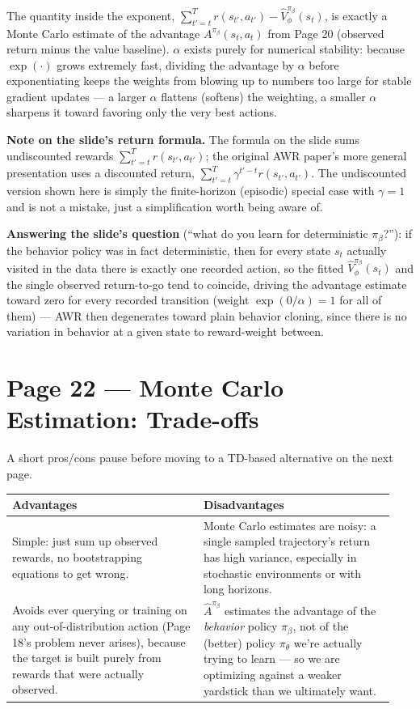 \documentclass[11pt]{article}
\begin{document}
The quantity inside the exponent, $\sum_{t'=t}^T r(s_{t'},a_{t'}) - \hat V^{\pi_\beta}_\phi(s_t)$, is exactly a Monte Carlo estimate of the advantage $A^{\pi_\beta}(s_t,a_t)$ from Page 20 (observed return minus the value baseline). $\alpha$ exists purely for numerical stability: because $\exp(\cdot)$ grows extremely fast, dividing the advantage by $\alpha$ before exponentiating keeps the weights from blowing up to numbers too large for stable gradient updates --- a larger $\alpha$ flattens (softens) the weighting, a smaller $\alpha$ sharpens it toward favoring only the very best actions.

\textbf{Note on the slide's return formula.} The formula on the slide sums undiscounted rewards $\sum_{t'=t}^T r(s_{t'},a_{t'})$; the original AWR paper's more general presentation uses a discounted return, $\sum_{t'=t}^T \gamma^{t'-t} r(s_{t'},a_{t'})$. The undiscounted version shown here is simply the finite-horizon (episodic) special case with $\gamma=1$ and is not a mistake, just a simplification worth being aware of.

\textbf{Answering the slide's question} (``what do you learn for deterministic $\pi_\beta$?''): if the behavior policy was in fact deterministic, then for every state $s_t$ actually visited in the data there is exactly one recorded action, so the fitted $\hat V^{\pi_\beta}_\phi(s_t)$ and the single observed return-to-go tend to coincide, driving the advantage estimate toward zero for every recorded transition (weight $\exp(0/\alpha)=1$ for all of them) --- AWR then degenerates toward plain behavior cloning, since there is no variation in behavior at a given state to reward-weight between.

\section*{Page 22 --- Monte Carlo Estimation: Trade-offs}

A short pros/cons pause before moving to a TD-based alternative on the next page.

\begin{center}
\begin{tabular}{@{}p{0.47\linewidth}p{0.47\linewidth}@{}}
\toprule
Advantages & Disadvantages \\
\midrule
Simple: just sum up observed rewards, no bootstrapping equations to get wrong. & Monte Carlo estimates are noisy: a single sampled trajectory's return has high variance, especially in stochastic environments or with long horizons. \\
Avoids ever querying or training on any out-of-distribution action (Page 18's problem never arises), because the target is built purely from rewards that were actually observed. & $\hat A^{\pi_\beta}$ estimates the advantage of the \emph{behavior} policy $\pi_\beta$, not of the (better) policy $\pi_\theta$ we're actually trying to learn --- so we are optimizing against a weaker yardstick than we ultimately want. \\
\bottomrule
\end{tabular}
\end{center}
\end{document}
